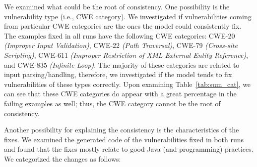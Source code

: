 \begin{table}[!htbp]
	\caption{Pass/Fail ratios for consistently fixed CWEs.}\centering

	\footnotesize
	\label{tab:sum_cat}
\end{table}


We examined what could be the root of consistency.
One possibility is the vulnerability type (i.e., CWE category).
We investigated if vulnerabilities coming from particular CWE categories are the ones the model could consistently fix.
The \consistentcount{} examples fixed in all runs have the following CWE categories: CWE-20 \textit{(Improper Input Validation)}, CWE-22 \textit{(Path Traversal)}, CWE-79 \textit{(Cross-site Scripting)}, CWE-611 \textit{(Improper Restriction of XML External Entity Reference)}, and CWE-835 \textit{(Infinite Loop)}.
The majority of these categories are related to input parsing/handling, therefore, we investigated if the model tends to fix vulnerabilities of these types correctly.
Upon examining Table~\ref{tab:sum_cat}, we can see that these CWE categories do appear with a great percentage in the failing examples as well; thus, the CWE category cannot be the root of consistency.

Another possibility for explaining the consistency is the characteristics of the fixes.
We examined the generated code of the \consistentcount{} vulnerabilities fixed in both runs and found that the fixes mostly relate to good Java (and programming) practices.
We categorized the changes as follows:


